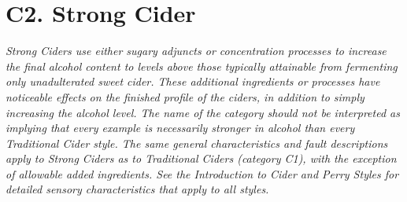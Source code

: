 \section*{C2. Strong Cider}
\textit{Strong Ciders use either sugary adjuncts or concentration processes to increase the final alcohol content to levels above those typically attainable from fermenting only unadulterated sweet cider. These additional ingredients or processes have noticeable effects on the finished profile of the ciders, in addition to simply increasing the alcohol level. The name of the category should not be interpreted as implying that every example is necessarily stronger in alcohol than every Traditional Cider style. The same general characteristics and fault descriptions apply to Strong Ciders as to Traditional Ciders (category C1), with the exception of allowable added ingredients. See the Introduction to Cider and Perry Styles for detailed sensory characteristics that apply to all styles.}